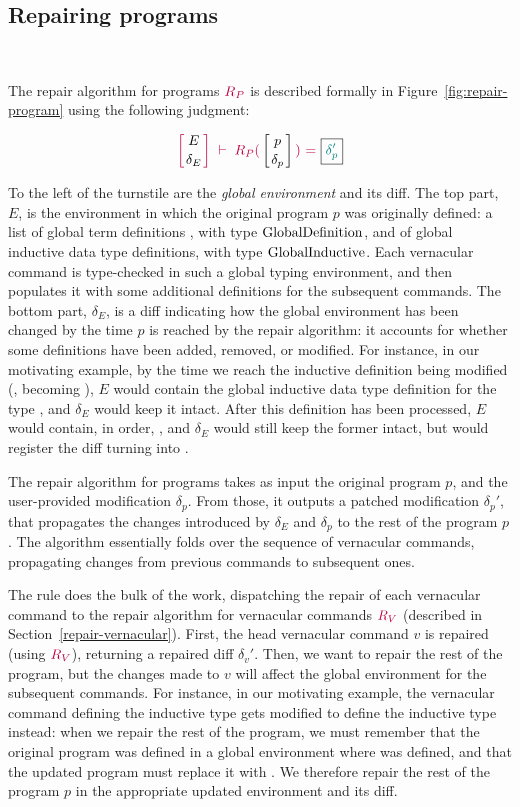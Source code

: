 \subsection{Repairing programs}~\label{repair-program}

The repair algorithm for programs $\textcolor{purple}{R_{P}}$ is described formally in
Figure~\ref{fig:repair-program} using the following judgment:

{
  \[
    {\turnstile
      {\denv{E}{\delta_E}}
      {\repairProg{p}{\delta_p}{\delta_p'}}
    }
  \]
}

\noindent To the left of the turnstile are the \textit{global environment} and
its diff.  The top part, $E$, is the environment in which the original program
$p$ was originally defined: a list of global term definitions , with type
$\text{Global\-Definition}$, and of global inductive data type definitions, with
type $\text{Global\-Inductive}$.  Each vernacular command is type-checked in such a
global typing environment, and then populates it with some additional
definitions for the subsequent commands.  The bottom part, $\delta_E$, is a diff
indicating how the global environment has been changed by the time $p$ is
reached by the repair algorithm: it accounts for whether some definitions have
been added, removed, or modified.  For instance, in our motivating example, by
the time we reach the inductive definition being modified (,
becoming ), $E$ would contain the global inductive data type
definition for the type , and $\delta_E$ would keep it intact.
After this definition has been processed, $E$ would contain, in order,
 , and $\delta_E$ would still keep the former
intact, but would register the diff turning  into
.

The repair algorithm for programs takes as input the original program $p$, and
the user-provided modification $\delta_p$.  From those, it outputs a patched
modification $\delta_p'$, that propagates the changes introduced by $\delta_E$
and $\delta_p$ to the rest of the program $p$.  The algorithm essentially folds
over the sequence of vernacular commands, propagating changes from previous
commands to subsequent ones.

The rule  does the bulk of the work, dispatching the repair
of each vernacular command to the repair algorithm for vernacular commands
$\textcolor{purple}{R_{V}}$ (described in Section~\ref{repair-vernacular}).  First, the
head vernacular command $v$ is repaired (using $\textcolor{purple}{R_{V}}$), returning a
repaired diff $\delta_v'$.  Then, we want to repair the rest of the program, but
the changes made to $v$ will affect the global environment for the subsequent
commands.  For instance, in our motivating example, the vernacular command
defining the inductive type  gets modified to define the
inductive type  instead: when we repair the rest of the program,
we must remember that the original program was defined in a global environment
where  was defined, and that the updated program must replace it
with .  We therefore repair the rest of the program $p$ in the
appropriate updated environment and its diff.

